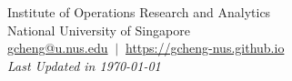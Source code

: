 \documentclass[12pt, a4paper]{article}
\begin{document}




{\par {} \par}
\centering
{\footnotesize Institute of Operations Research and Analytics} \\
{\footnotesize National University of Singapore} \\
{\footnotesize \href{mailto:gcheng@u.nus.edu}{gcheng@u.nus.edu}} $\ \vert \ $ \footnotesize{\href{https://gcheng-nus.github.io}{https://gcheng-nus.github.io}} \\
\vspace*{0.5em}
{\footnotesize \textit{Last Updated in \monthyeardate\today}}

\vspace*{1em}
\end{document}
